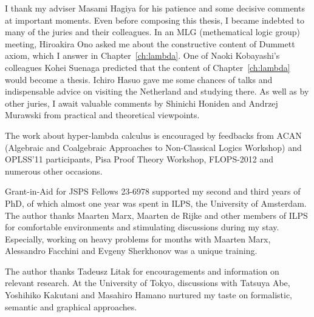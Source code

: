 \begin{acknowledge}
 I thank my adviser Masami Hagiya for his patience and some decisive
 comments at important moments.
 Even before composing this thesis, I became indebted to many of the
 juries and their colleagues.
 In an MLG (methematical logic group) meeting, Hiroakira Ono asked me
 about the constructive content of Dummett axiom, which I answer in
 Chapter~\ref{ch:lambda}.
 One of Naoki Kobayashi's colleagues Kohei Suenaga predicted that the
 content of Chapter~\ref{ch:lambda} would become a thesis.
 Ichiro Hasuo gave me some chances of talks and
 indispensable advice on visiting the Netherland
 and studying there.
 As well as by other juries,
 I await valuable comments by Shinichi Honiden and Andrzej Murawski from
 practical and theoretical viewpoints.

 The work about hyper-lambda calculus is encouraged by feedbacks from
 ACAN (Algebraic and Coalgebraic Approaches to
 Non-Classical Logics Workshop) and OPLSS'11 participants,
 Pisa Proof Theory Workshop, FLOPS-2012
 and numerous other occasions.

 Grant-in-Aid for JSPS Fellows 23-6978 supported
 my second and third years of PhD, of which almost one year was spent
 in ILPS, the University of Amsterdam.
 The author thanks Maarten Marx, Maarten de Rijke and other members of ILPS for
 comfortable environments and stimulating discussions during my stay.
 Especially, working on heavy problems for months with Maarten Marx, Alessandro
 Facchini and Evgeny Sherkhonov was a unique training.

 The author thanks Tadeusz Litak for encouragements and
 information on relevant research.
 At the University of Tokyo,
 discussions with Tatsuya Abe, Yoshihiko Kakutani and Masahiro Hamano
 nurtured my taste on formalistic, semantic and graphical approaches.
\end{acknowledge}
